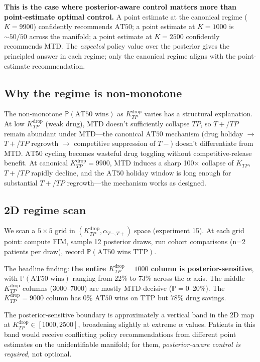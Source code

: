 \documentclass[11pt]{article}
\newcommand{\Prob}{\mathbb{P}}
\newcommand{\TTP}{\mathrm{TTP}}
\newcommand{\AT}{\mathrm{AT}}
\newcommand{\Kdrop}{K_{TP}^{\text{drop}}}
\newcommand{\Tplus}{T{+}}
\newcommand{\Tminus}{T{-}}
\begin{document}
\textbf{This is the case where posterior-aware control matters more than
point-estimate optimal control.} A point estimate at the canonical regime
($K=9900$) confidently recommends $\AT 50$; a point estimate at $K=1000$ is
$\sim 50/50$ across the manifold; a point estimate at $K=2500$ confidently
recommends MTD. The \emph{expected} policy value over the posterior gives the
principled answer in each regime; only the canonical regime aligns with the
point-estimate recommendation.

\subsection{Why the regime is non-monotone}

The non-monotone $\Prob(\AT 50 \text{ wins})$ as $\Kdrop$ varies has a
structural explanation. At low $\Kdrop$ (weak drug), MTD doesn't sufficiently
collapse $TP$, so $\Tplus$/$TP$ remain abundant under MTD---the canonical $\AT 50$
mechanism (drug holiday $\to$ $\Tplus$/$TP$ regrowth $\to$ competitive
suppression of $\Tminus$) doesn't differentiate from MTD. $\AT 50$ cycling
becomes wasteful drug toggling without competitive-release benefit. At canonical
$\Kdrop = 9900$, MTD induces a sharp 100$\times$ collapse of $K_{TP}$,
$\Tplus$/$TP$ rapidly decline, and the $\AT 50$ holiday window is long enough
for substantial $\Tplus$/$TP$ regrowth---the mechanism works as designed.

\subsection{2D regime scan}

We scan a $5 \times 5$ grid in $(\Kdrop, \alpha_{\Tminus,\Tplus})$ space
(experiment 15). At each grid point: compute FIM, sample 12 posterior draws, run
cohort comparisons (n=2 patients per draw), record $\Prob(\AT 50 \text{ wins } \TTP)$.

The headline finding: \textbf{the entire $\Kdrop = 1000$ column is
posterior-sensitive}, with $\Prob(\AT 50 \text{ wins})$ ranging from 22\% to
73\% across the $\alpha$ axis. The middle $\Kdrop$ columns (3000--7000) are
mostly MTD-decisive ($\Prob = 0$--20\%). The $\Kdrop = 9000$ column has 0\% $\AT 50$
wins on TTP but 78\% drug savings.

The posterior-sensitive boundary is approximately a vertical band in the 2D map
at $\Kdrop \in [1000, 2500]$, broadening slightly at extreme $\alpha$ values.
Patients in this band would receive conflicting policy recommendations from
different point estimates on the unidentifiable manifold; for them,
\emph{posterior-aware control is required}, not optional.
\end{document}
